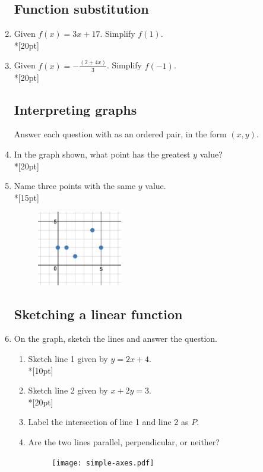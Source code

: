 \documentclass[]{book}
\begin{document}
\begin{enumerate}
\subsection*{Function substitution}
\item Given $f(x)=3x+17$. Simplify $f(1)$.\\*[20pt]
\item Given $\displaystyle f(x)=-\frac{(2+4x)}{3}$. Simplify $f(-1)$.\\*[20pt]

\subsection*{Interpreting graphs}
Answer each question with as an ordered pair, in the form $(x, y)$.
\item In the graph shown, what point has the greatest $y$ value?\\*[20pt]
\item Name three points with the same $y$ value.\\*[15pt]

\begin{figure}[!ht]
    \centering
    \includegraphics[width=0.35\textwidth]{discrete-domain-graph.jpeg}
\end{figure}

\newpage

\subsection*{Sketching a linear function}

\item   On the graph, sketch the lines and answer the question.
\begin{enumerate}
    \item Sketch line 1 given by $y=2x+4$.\\*[10pt]
    \item Sketch line 2 given by $x+2y=3$.\\*[20pt]
    \item Label the intersection of line 1 and line 2 as $P$.
    \item Are the two lines parallel, perpendicular, or neither?
\begin{figure}[!ht]
    \flushright
    \texttt{[image: simple-axes.pdf]}
\end{figure}


\end{enumerate}
\end{enumerate}
\end{document}
